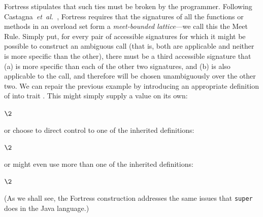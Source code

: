 Fortress stipulates that such ties must be broken by the programmer.
Following Castagna~\emph{et~al.}~\cite{LFP92-OVERLOADED-FUNCTIONS-WITH-SUBTYPING}, Fortress requires that the signatures
of all the functions or methods in an overload set form a \emph{meet-bounded lattice}---we call this the Meet Rule.
Simply put, for every pair of accessible signatures for which it might be possible
to construct an ambiguous call (that is, both are applicable and neither is more specific
than the other), there must be a third accessible signature that (a) is more
specific than each of the other two signatures, and (b) is also applicable to the call, and therefore will
be chosen unambiguously over the other two.
We can repair the previous example by introducing an appropriate definition of  into trait .
This might simply supply a value on its own:
\begin{codeexamplesize}
\begin{tabbing}
\(\2\)
\end{tabbing}
\end{codeexamplesize}
or choose to direct control to one of the inherited definitions:
\begin{codeexamplesize}
\begin{tabbing}
\(\2\) 
\end{tabbing}
\end{codeexamplesize}
or might even use more than one of the inherited definitions:
\begin{codeexamplesize}
\begin{tabbing}
\(\2\) 
\end{tabbing}
\end{codeexamplesize}
(As we shall see, the Fortress  construction addresses the same issues that {\tt super} does in the Java language.)

